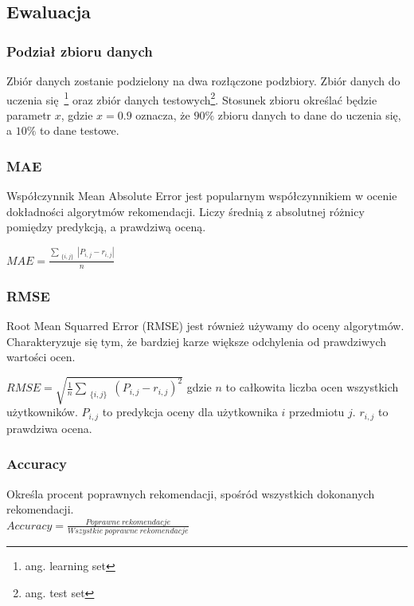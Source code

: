 \documentclass[12pt, a4paper]{article}
\begin{document}
\subsection{Ewaluacja}

\subsubsection{Podział zbioru danych}
Zbiór danych zostanie podzielony na dwa rozłączone podzbiory. Zbiór danych do uczenia się\
\footnote{ang. learning set} oraz zbiór danych testowych\footnote{ang. test set}. Stosunek
zbioru określać będzie parametr $x$, gdzie $x = 0.9$ oznacza, że $90\%$ zbioru danych to
dane do uczenia się, a $10\%$ to dane testowe.

\subsubsection{MAE}
Współczynnik Mean Absolute Error jest popularnym współczynnikiem w ocenie dokładności
algorytmów rekomendacji. Liczy średnią z absolutnej różnicy pomiędzy predykcją, a prawdziwą
oceną.

\begin{math}
MAE = \frac{
        \sum_{\substack{
   \{i, j\}
  }}
  |P_{i,j} - r_{i,j}|
}{n}
\end{math}

\subsubsection{RMSE}
Root Mean Squarred Error (RMSE) jest również używamy do oceny algorytmów. Charakteryzuje
się tym, że bardziej karze większe odchylenia od prawdziwych wartości ocen.

\begin{math}
RMSE = \sqrt{
        \frac{1}{n} \sum_{ \substack{
                \{i,j\}
        } }
        (P_{i,j} - r_{i,j})^2
}
\end{math}
gdzie $n$ to całkowita liczba ocen wszystkich użytkowników. $P_{i,j}$ to predykcja oceny
dla użytkownika $i$ przedmiotu $j$. $r_{i,j}$ to prawdziwa ocena.

\subsubsection{Accuracy}
Określa procent poprawnych rekomendacji, spośród wszystkich dokonanych rekomendacji.\\
$Accuracy = \frac{Poprawne\:rekomendacje}{Wszystkie \:poprawne\: rekomendacje}$
\end{document}
